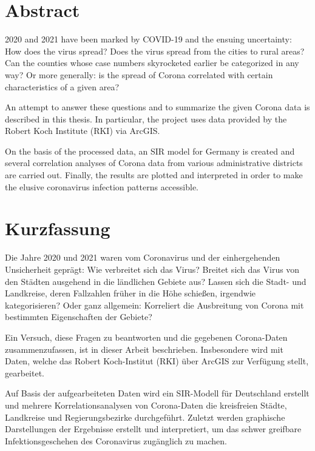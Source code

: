 \chapter*{Abstract}
2020 and 2021 have been marked by COVID-19 and the ensuing uncertainty:
How does the virus spread? Does the virus spread from the cities to rural areas? Can the counties whose case numbers skyrocketed earlier be categorized in any way? Or more generally: is the spread of Corona correlated with certain characteristics of a given area?

An attempt to answer these questions and to summarize the given Corona data is described in this thesis. In particular, the project uses data provided by the Robert Koch Institute (RKI) via ArcGIS.

On the basis of the processed data, an SIR model for Germany is created and several correlation analyses of Corona data from various administrative districts are carried out.
Finally, the results are plotted and interpreted in order to make the elusive coronavirus infection patterns accessible.

\chapter*{Kurzfassung}
Die Jahre 2020 und 2021 waren vom Coronavirus und der einhergehenden Unsicherheit geprägt:
Wie verbreitet sich das Virus? Breitet sich das Virus von den Städten ausgehend in die ländlichen Gebiete aus? Lassen sich die Stadt- und Landkreise, deren Fallzahlen früher in die Höhe schießen, irgendwie kategorisieren? Oder ganz allgemein: Korreliert die Ausbreitung von Corona mit bestimmten Eigenschaften der Gebiete?

Ein Versuch, diese Fragen zu beantworten und die gegebenen Corona-Daten zusammenzufassen, ist in dieser Arbeit beschrieben. Insbesondere wird mit Daten, welche das Robert Koch-Institut (RKI) über ArcGIS zur Verfügung stellt, gearbeitet.

Auf Basis der aufgearbeiteten Daten wird ein SIR-Modell für Deutschland erstellt und mehrere Korrelationsanalysen von Corona-Daten die kreisfreien Städte, Landkreise und Regierungsbezirke durchgeführt.
Zuletzt werden graphische Darstellungen der Ergebnisse erstellt und interpretiert, um das schwer greifbare Infektionsgeschehen des Coronavirus zugänglich zu machen.
\newpage